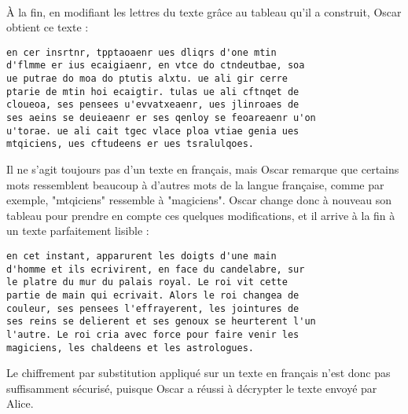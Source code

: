 		\\
		À la fin, en modifiant les lettres du texte grâce au tableau qu'il a construit, Oscar obtient ce texte :
		\begin{lstlisting}
en cer insrtnr, tpptaoaenr ues dliqrs d'one mtin
d'flmme er ius ecaigiaenr, en vtce do ctndeutbae, soa
ue putrae do moa do ptutis alxtu. ue ali gir cerre
ptarie de mtin hoi ecaigtir. tulas ue ali cftnqet de
cloueoa, ses pensees u'evvatxeaenr, ues jlinroaes de
ses aeins se deuieaenr er ses qenloy se feoareaenr u'on
u'torae. ue ali cait tgec vlace ploa vtiae genia ues
mtqiciens, ues cftudeens er ues tsralulqoes.
		\end{lstlisting}
		Il ne s'agit toujours pas d'un texte en français, mais Oscar remarque que certains mots ressemblent beaucoup à d'autres mots de la langue française, comme par exemple, "mtqiciens" ressemble à "magiciens". Oscar change donc à nouveau son tableau pour prendre en compte ces quelques modifications, et il arrive à la fin à un texte parfaitement lisible :
		\begin{lstlisting}
en cet instant, apparurent les doigts d'une main
d'homme et ils ecrivirent, en face du candelabre, sur
le platre du mur du palais royal. Le roi vit cette
partie de main qui ecrivait. Alors le roi changea de
couleur, ses pensees l'effrayerent, les jointures de
ses reins se delierent et ses genoux se heurterent l'un
l'autre. Le roi cria avec force pour faire venir les
magiciens, les chaldeens et les astrologues.
		\end{lstlisting}
		Le chiffrement par substitution appliqué sur un texte en français n'est donc pas suffisamment sécurisé, puisque Oscar a réussi à décrypter le texte envoyé par Alice.